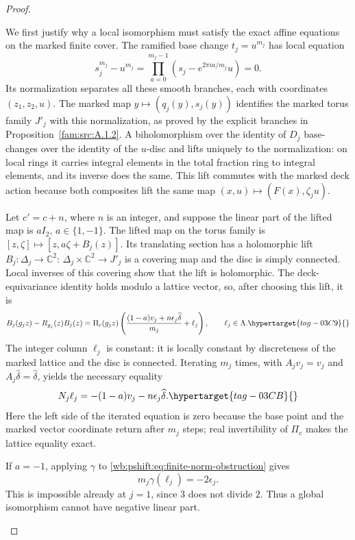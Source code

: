 \begin{proof}
\begin{enumerate}[label=\arabic*.,leftmargin=*]
We first justify why a local isomorphism must satisfy the exact affine
equations on the marked finite cover. The ramified base change
$t_j=u^{m_j}$ has local equation
\[
 s_j^{m_j}-u^{m_j}
   =\prod_{a=0}^{m_j-1}(s_j-e^{2\pi ia/m_j}u)=0.
\]
Its normalization separates all these smooth branches, each with
coordinates $(z_1,z_2,u)$. The marked map
$y\mapsto(q_j(y),s_j(y))$ identifies the marked torus family $J'_j$
with this normalization, as proved by the explicit branches in
Proposition~\ref{fam:src:A.1.2}. A biholomorphism over the identity of
$D_j$ base-changes over the identity of the $u$-disc and lifts uniquely
to the normalization: on local rings it carries integral elements in
the total fraction ring to integral elements, and its inverse does
the same. This lift commutes with the marked deck action because
both composites lift the same map $(x,u)\mapsto(F(x),\zeta_j u)$.

Let $c'=c+n$, where $n$ is an integer, and suppose the linear part of
the lifted map is $aI_2$, $a\in\{1,-1\}$. The lifted map on the torus
family is $[z,\zeta]\mapsto[z,a\zeta+B_j(z)]$. Its translating
section has a holomorphic lift $B_j:\Delta_j\to\mathbb C^2$:
$\Delta_j\times\mathbb C^2\to J'_j$ is a covering map and the disc is
simply connected. Local inverses of this covering show that the lift
is holomorphic. The deck-equivariance identity holds modulo a
lattice vector, so, after choosing this lift, it is
\begin{equation}
 B_j(g_jz)-R_{g_j}(z)B_j(z)
  =\Pi_c(g_jz)\left(
       \frac{(1-a)v_j+n\epsilon_j\widehat\delta}{m_j}
          +\ell_j\right),\qquad \ell_j\in\Lambda.
 \hypertarget{tag-03C9}{}\label{wb:pshift:eq:finite-equation}
\end{equation}
The integer column $\ell_j$ is constant: it is locally constant by
discreteness of the marked lattice and the disc is connected.
Iterating $m_j$ times, with $A_jv_j=v_j$ and
$A_j\widehat\delta=\widehat\delta$, yields the necessary equality
\begin{equation}
 N_j\ell_j=-(1-a)v_j-n\epsilon_j\widehat\delta.
 \hypertarget{tag-03CB}{}\label{wb:pshift:eq:finite-norm-obstruction}
\end{equation}
Here the left side of the iterated equation is zero because the
base point and the marked vector coordinate return after $m_j$
steps; real invertibility of $\Pi_c$ makes the lattice equality exact.

If $a=-1$, applying $\gamma$ to \eqref{wb:pshift:eq:finite-norm-obstruction} gives
\[
                   m_j\gamma(\ell_j)=-2\epsilon_j.
\]
This is impossible already at $j=1$, since $3$ does not divide $2$.
Thus a global isomorphism cannot have negative linear part.


\end{enumerate}
\end{proof}
